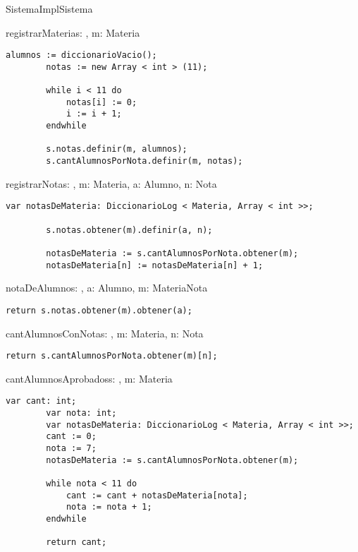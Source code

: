 \begin{module}{SistemaImpl}{}{Sistema}{}
\begin{proc}{registrarMateria}{\Inout s: \moduletype, \In m: Materia}{}
\begin{lstlisting}[numbers=none,frame=none]
		alumnos := diccionarioVacio();
		notas := new Array < int > (11);

		while i < 11 do
			notas[i] := 0;
			i := i + 1;
		endwhile

		s.notas.definir(m, alumnos);
		s.cantAlumnosPorNota.definir(m, notas);
		\end{lstlisting}
	\end{proc}

	\begin{proc}{registrarNota}{\Inout s: \moduletype, \In m: Materia, \In a: Alumno, \In n: Nota}{}
		\begin{lstlisting}[numbers=none,frame=none]
		var notasDeMateria: DiccionarioLog < Materia, Array < int >>;

		s.notas.obtener(m).definir(a, n);
		
		notasDeMateria := s.cantAlumnosPorNota.obtener(m);
		notasDeMateria[n] := notasDeMateria[n] + 1;
		\end{lstlisting}
	\end{proc}

	\begin{proc}{notaDeAlumno}{\In s: \moduletype, \In a: Alumno, \In m: Materia}{Nota}
		\begin{lstlisting}[numbers=none,frame=none]
		return s.notas.obtener(m).obtener(a);
		\end{lstlisting}
	\end{proc}

	\begin{proc}{cantAlumnosConNota}{\In s: \moduletype, \In m: Materia, \In n: Nota}{\Int}
		\begin{lstlisting}[numbers=none,frame=none]
		return s.cantAlumnosPorNota.obtener(m)[n];
		\end{lstlisting}
	\end{proc}

	\begin{proc}{cantAlumnosAprobados}{\In s: \moduletype, \In m: Materia}{\Int}
		\begin{lstlisting}[numbers=none,frame=none]
		var cant: int;
		var nota: int;
		var notasDeMateria: DiccionarioLog < Materia, Array < int >>;
		cant := 0;
		nota := 7;
		notasDeMateria := s.cantAlumnosPorNota.obtener(m);

		while nota < 11 do
			cant := cant + notasDeMateria[nota];
			nota := nota + 1;
		endwhile

		return cant;
		\end{lstlisting}
	\end{proc}
\end{module}

